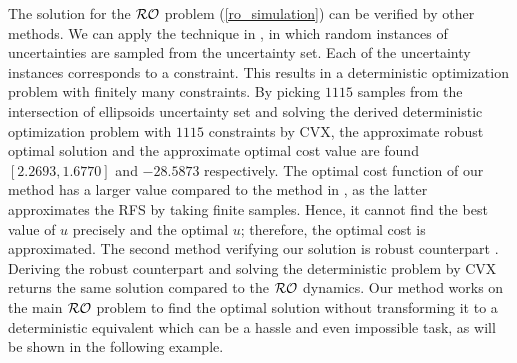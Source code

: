 \documentclass[journal,twoside,web]{ieeecolor}
\begin{document}
The solution for the ${\cal RO}$ problem (\ref{ro_simulation}) can be verified by other methods. We can apply the technique in \cite{calafiore2004}, in which random instances of uncertainties are sampled from the uncertainty set. Each of the uncertainty instances corresponds to a constraint. This results in a deterministic optimization problem with finitely many constraints.  By picking $1115$ samples from the intersection of ellipsoids uncertainty set and solving the derived deterministic optimization problem with $1115$ constraints by CVX, the approximate robust optimal solution and the approximate optimal cost value are found $[2.2693, 1.6770]$ and $-28.5873$ respectively. The optimal cost function of our method has a larger value compared to the method in \cite{calafiore2004}, as the latter approximates the RFS by taking finite samples. Hence, it cannot find the best value of $u$ precisely and the optimal $u$; therefore, the optimal cost is approximated. The second method verifying our solution is robust counterpart \cite{bental2009}. Deriving the robust counterpart and solving the deterministic problem by CVX returns the same solution compared to the ${\cal RO}$ dynamics. Our method works on the main ${\cal RO}$ problem to find the optimal solution without transforming it to a deterministic equivalent which can be a hassle and even impossible task, as will be shown in the following example.
\end{document}
